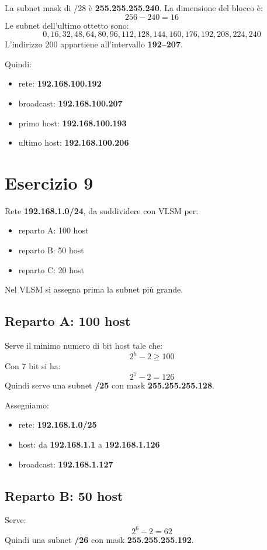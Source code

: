 \documentclass[a4paper,12pt]{article}
\begin{document}
La subnet mask di /28 è \textbf{255.255.255.240}. La dimensione del blocco è:
\[
256 - 240 = 16
\]
Le subnet dell'ultimo ottetto sono:
\[
0, 16, 32, 48, 64, 80, 96, 112, 128, 144, 160, 176, 192, 208, 224, 240
\]
L'indirizzo 200 appartiene all'intervallo \textbf{192--207}.

Quindi:
\begin{itemize}
    \item rete: \textbf{192.168.100.192}
    \item broadcast: \textbf{192.168.100.207}
    \item primo host: \textbf{192.168.100.193}
    \item ultimo host: \textbf{192.168.100.206}
\end{itemize}

\section*{Esercizio 9}
Rete \textbf{192.168.1.0/24}, da suddividere con VLSM per:
\begin{itemize}
    \item reparto A: 100 host
    \item reparto B: 50 host
    \item reparto C: 20 host
\end{itemize}

Nel VLSM si assegna prima la subnet più grande.

\subsection*{Reparto A: 100 host}
Serve il minimo numero di bit host tale che:
\[
2^h - 2 \geq 100
\]
Con 7 bit si ha:
\[
2^7 - 2 = 126
\]
Quindi serve una subnet \textbf{/25} con mask \textbf{255.255.255.128}.

Assegniamo:
\begin{itemize}
    \item rete: \textbf{192.168.1.0/25}
    \item host: da \textbf{192.168.1.1} a \textbf{192.168.1.126}
    \item broadcast: \textbf{192.168.1.127}
\end{itemize}

\subsection*{Reparto B: 50 host}
Serve:
\[
2^6 - 2 = 62
\]
Quindi una subnet \textbf{/26} con mask \textbf{255.255.255.192}.
\end{document}
